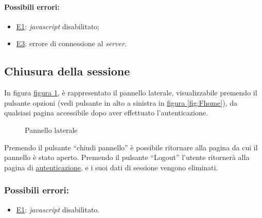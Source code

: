 \paragraph*{Possibili errori:}
\begin{itemize}
\item \hyperref[e1]{E1}: \textit{javascript} disabilitato;
\item \hyperref[e3]{E3}: errore di connessione al \textit{server}.
\end{itemize}

\subsection{Chiusura della sessione}
\label{logout}
In figura \hyperref[fig:Flogout]{figura \ref{fig:Flogout}}, è rappresentato il pannello laterale, visualizzabile premendo il pulsante opzioni (vedi pulsante in alto a sinistra in \hyperref[fig:Fhome]{figura \ref{fig:Fhome}}), da qualsiasi pagina accessibile dopo aver effettuato l'autenticazione.

\begin{figure}[H] \centering 
{} \caption{Pannello laterale}
\label{fig:Flogout}
\end{figure}

Premendo il pulsante ``chiudi pannello'' è possibile ritornare alla pagina da cui il pannello è stato aperto.
Premendo il pulsante ``Logout'' l'utente ritornerà alla pagina di \hyperref[autenticazione]{autenticazione}, e i suoi dati di sessione vengono eliminati.

\subsubsection*{Possibili errori:}
\begin{itemize}
\item \hyperref[e1]{E1}: \textit{javascript} disabilitato.
\end{itemize}